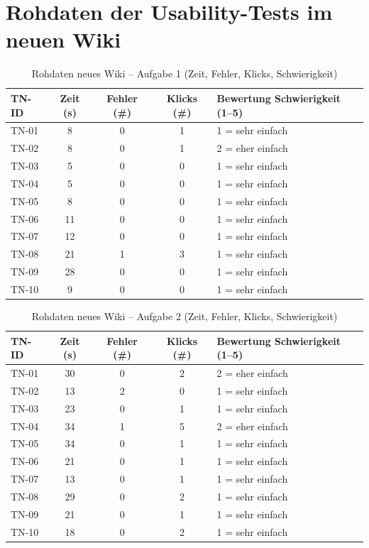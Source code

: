\section{Rohdaten der Usability-Tests im neuen Wiki}
\label{sec:BB-05_usability_neu-tables}

\begin{table}[H]
\centering
\caption{Rohdaten neues Wiki -- Aufgabe 1 (Zeit, Fehler, Klicks, Schwierigkeit)}
\label{tab:BB-neu-task1}
\begin{tabularx}{\textwidth}{l c c c X}
\toprule
TN-ID & Zeit (s) & Fehler (\#) & Klicks (\#) & Bewertung Schwierigkeit (1--5) \\
\midrule
TN-01 & 8 & 0 & 1 & 1 = sehr einfach \\
TN-02 & 8 & 0 & 1 & 2 = eher einfach \\
TN-03 & 5 & 0 & 0 & 1 = sehr einfach \\
TN-04 & 5 & 0 & 0 & 1 = sehr einfach \\
TN-05 & 8 & 0 & 0 & 1 = sehr einfach \\
TN-06 & 11 & 0 & 0 & 1 = sehr einfach \\
TN-07 & 12 & 0 & 0 & 1 = sehr einfach \\
TN-08 & 21 & 1 & 3 & 1 = sehr einfach \\
TN-09 & 28 & 0 & 0 & 1 = sehr einfach \\
TN-10 & 9 & 0 & 0 & 1 = sehr einfach \\
\bottomrule
\end{tabularx}
\end{table}

\begin{table}[H]
\centering
\caption{Rohdaten neues Wiki -- Aufgabe 2 (Zeit, Fehler, Klicks, Schwierigkeit)}
\label{tab:BB-neu-task2}
\begin{tabularx}{\textwidth}{l c c c X}
\toprule
TN-ID & Zeit (s) & Fehler (\#) & Klicks (\#) & Bewertung Schwierigkeit (1--5) \\
\midrule
TN-01 & 30 & 0 & 2 & 2 = eher einfach \\
TN-02 & 13 & 2 & 0 & 1 = sehr einfach \\
TN-03 & 23 & 0 & 1 & 1 = sehr einfach \\
TN-04 & 34 & 1 & 5 & 2 = eher einfach \\
TN-05 & 34 & 0 & 1 & 1 = sehr einfach \\
TN-06 & 21 & 0 & 1 & 1 = sehr einfach \\
TN-07 & 13 & 0 & 1 & 1 = sehr einfach \\
TN-08 & 29 & 0 & 2 & 1 = sehr einfach \\
TN-09 & 21 & 0 & 1 & 1 = sehr einfach \\
TN-10 & 18 & 0 & 2 & 1 = sehr einfach \\
\bottomrule
\end{tabularx}
\end{table}

